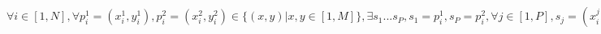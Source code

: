 \documentclass{article}
\begin{document}
\section{}
$\forall i \in [1, N], \forall p^1_i = (x^1_i, y^1_i), p^2_i = (x^2_i, y^2_i) \in \{(x, y) | x, y \in [1, M]\}, \exists s_1...s_P, s_1 = p^1_i, s_P = p^2_i, \forall j \in [1, P], s_j = (x^j_i, y^j_i) = i$
\end{document}
